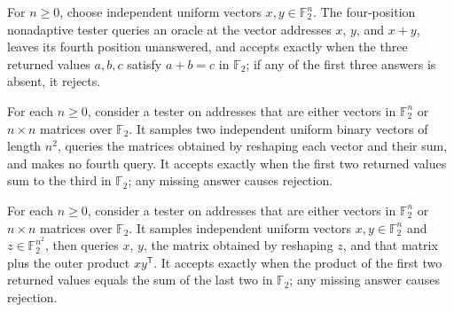 \begin{definition}
\label{FABL.quadraticPairLinearBLRTester}
\leanok
{}
For $n\ge 0$, choose independent uniform vectors $x,y\in\mathbb{F}_2^n$. The
four-position nonadaptive tester queries an oracle at the vector addresses $x$, $y$, and
$x+y$, leaves its fourth position unanswered, and accepts exactly when the three
returned values $a,b,c$ satisfy $a+b=c$ in $\mathbb{F}_2$; if any of the first three
answers is absent, it rejects.
\end{definition}

\begin{definition}
\label{FABL.quadraticPairMatrixBLRTester}
\leanok
{}
For each $n\ge 0$, consider a tester on addresses that are either vectors in $\mathbb
F_2^n$ or $n\times n$ matrices over $\mathbb F_2$. It samples two independent uniform
binary vectors of length $n^2$, queries the matrices obtained by reshaping each vector
and their sum, and makes no fourth query. It accepts exactly when the first two returned
values sum to the third in $\mathbb F_2$; any missing answer causes rejection.
\end{definition}

\begin{definition}
\label{FABL.quadraticPairRankOneTester}
\leanok
{}
For each $n\ge 0$, consider a tester on addresses that are either vectors in $\mathbb
F_2^n$ or $n\times n$ matrices over $\mathbb F_2$. It samples independent uniform
vectors $x,y\in\mathbb F_2^n$ and $z\in\mathbb F_2^{n^2}$, then queries $x$, $y$, the
matrix obtained by reshaping $z$, and that matrix plus the outer product $xy^{\mathsf
T}$. It accepts exactly when the product of the first two returned values equals the sum
of the last two in $\mathbb F_2$; any missing answer causes rejection.
\end{definition}

